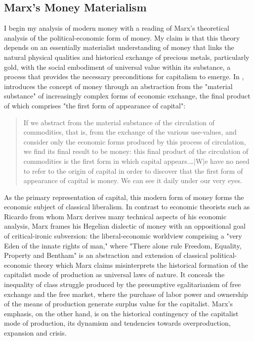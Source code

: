 \subsection*{Marx's Money Materialism}
I begin my analysis of modern money with a reading of Marx's theoretical analysis of the political-economic form of money. My claim is that this theory depends on an essentially materialist understanding of money that links the natural physical qualities and historical exchange of precious metals, particularly gold, with the social embodiment of universal value within its substance, a process that provides the necessary preconditions for capitalism to emerge. In , \citeauthor{MarxCapital} introduces the concept of money through an abstraction from the "material substance" of increasingly complex forms of economic exchange, the final product of which comprises "the first form of appearance of capital":
\blockquote{If we abstract from the material substance of the circulation of commodities, that is, from the exchange of the various use-values, and consider only the economic forms produced by this process of circulation, we find its final result to be money: this final product of the circulation of commodities is the first form in which capital appears.…|W|e have no need to refer to the origin of capital in order to discover that the first form of appearance of capital is money. We can see it daily under our very eyes. \autocite[ch.~4]{MarxCapital}}
As the primary representation of capital, this modern form of money forms the economic subject of classical liberalism. In contrast to economic theorists such as Ricardo from whom Marx derives many technical aspects of his economic analysis, Marx frames his Hegelian dialectic of money with an oppositional goal of critical-ironic subversion: the liberal-economic worldview comprising a "very Eden of the innate rights of man," where "There alone rule Freedom, Equality, Property and Bentham" \autocite[ch.~6]{MarxCapital} is an abstraction and extension of classical political-economic theory which Marx claims misinterprets the historical formation of the capitalist mode of production as universal laws of nature. It conceals the inequality of class struggle produced by the presumptive egalitarianism of free exchange and the free market, where the purchase of labor power and ownership of the means of production generate surplus value for the capitalist. Marx's emphasis, on the other hand, is on the historical contingency of the capitalist mode of production, its dynamism and tendencies towards overproduction, expansion and crisis.

